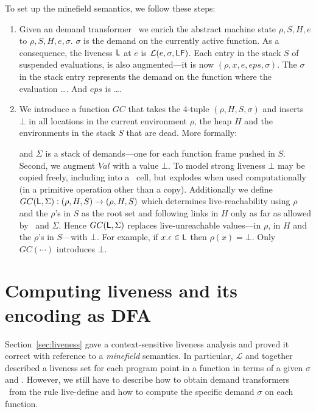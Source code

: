 \documentclass[9pt]{sigplanconf}
\begin{document}
To set up the minefield semantics, we follow these steps:
\begin{enumerate}
\item  Given an  demand transformer  \Lfonly\ we  enrich  the abstract
  machine state $\rho, S, H, e$  to $\rho, S, H, e, \sigma$.  $\sigma$
  is the  demand on the  currently active function. As  a consequence,
  the liveness $\mathsf{L}$ at $e$ is $\mathcal{L}(e, \sigma, \mathsf{LF})$. Each
  entry  in   the  stack  $S$   of  suspended  evaluations,   is  also
  augmented---it is  now $(\rho, x,  e, eps, \sigma)$. The $\sigma$  in the
  stack entry  represents the demand  on the  function where  the evaluation
  \ldots.  And $eps$ is \ldots.
\item We introduce a function $GC$ that takes the 4-tuple $(\rho, H, S,
  \sigma)$ and  inserts $\bot$ in all locations in the current
  environment $\rho$, the heap $H$ and the environments in the stack
  $S$ that are dead. More formally:





and $\Sigma$ is a  stack of demands---one for each function
  frame pushed in $S$.  Second,  we augment $Val$ with a value $\bot$.
  To model strong liveness $\bot$ may be copied freely, including into
  a  \CONS\  cell,  but  explodes  when  used  computationally  (in  a
  primitive operation  other than a copy). Additionally  we define $GC
  (\mathsf{L}, \Sigma)  : (\rho,  H, S) \rightarrow  (\rho ,  H , S  )$ which
  determines live-reachability using $\rho$ and the $\rho$'s in $S$ as
  the root  set and following links in  $H$ only as far  as allowed by
  \Lv\   and   $\Sigma$.     Hence   $GC   (\mathsf{L},   \Sigma)$   replaces
  live-unreachable  values---in $\rho$,  in  $H$ and  the $\rho$'s  in
  $S$---with $\bot$.  For example,  if $x.\epsilon \in \mathsf{L}$ then $\rho
  (x) = \bot$.  Only $GC (\cdots )$ introduces $\bot$.
\end{enumerate}  


 

\section{Computing liveness and its encoding as DFA}\label{sec:computing}
Section~\ref{sec:liveness} gave  a context-sensitive liveness analysis
and  {\color  {red}  proved  it  correct  with  reference  to  a  {\em
    minefield} semantics}.  In  particular, $\mathcal{L}$ and 
together described a liveness set for each program point in a function
in terms of  a given $\sigma$ and \Lfonly.  However,  we still have to
describe how to obtain demand transformers \Lfonly\ from the rule {\sc
  live-define} and how to compute the specific demand $\sigma$ on each
function.
\end{document}
